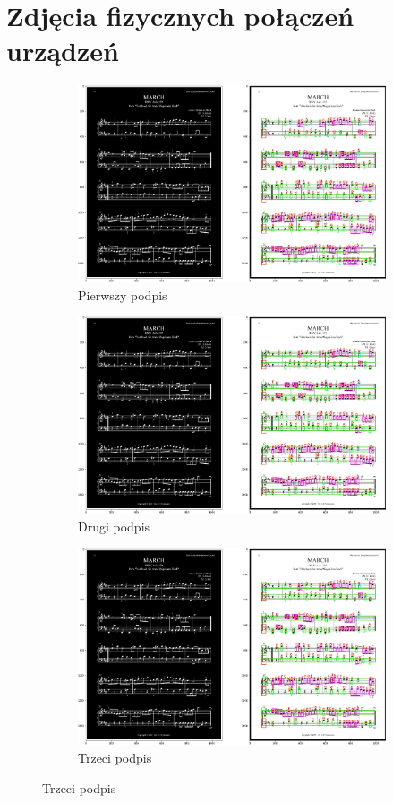 \documentclass[12pt]{article}
\begin{document}
\section{Zdjęcia fizycznych połączeń urządzeń}
\begin{figure}[h!]
	\centering
	\begin{subfigure}[b]{0.32\linewidth}
		\includegraphics[width=\linewidth]{Zdj0.png}
		\caption{Pierwszy podpis}
	\end{subfigure}
	\begin{subfigure}[b]{0.32\linewidth}
		\includegraphics[width=\linewidth]{Zdj0.png}
		\caption{Drugi podpis}
	\end{subfigure}
	\begin{subfigure}[b]{0.32\linewidth}
		\includegraphics[width=\linewidth]{Zdj0.png}
		\caption{Trzeci podpis}
	\end{subfigure}
	

\end{figure}
\end{document}
